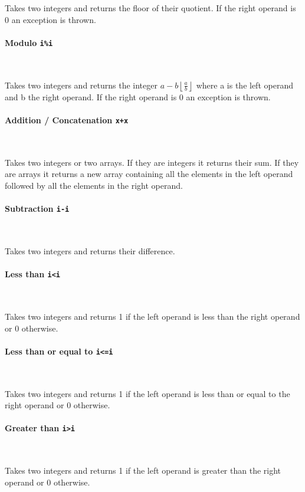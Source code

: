 Takes two integers and returns the floor of their quotient. If the right operand is 0 an exception is thrown.

\paragraph{Modulo \quad \texttt{i\%i}} \

Takes two integers and returns the integer $ a - b \left\lfloor \frac{a}{b} \right\rfloor $ where a is the left operand and b the right operand. If the right operand is 0 an exception is thrown.

\paragraph{Addition / Concatenation \quad \texttt{x+x}} \

Takes two integers or two arrays. If they are integers it returns their sum. If they are arrays it returns a new array containing all the elements in the left operand followed by all the elements in the right operand.

\paragraph{Subtraction \quad \texttt{i-i}} \

Takes two integers and returns their difference.

\paragraph{Less than \quad \texttt{i<i}} \

Takes two integers and returns 1 if the left operand is less than the right operand or 0 otherwise.

\paragraph{Less than or equal to \quad \texttt{i<=i}} \

Takes two integers and returns 1 if the left operand is less than or equal to the right operand or 0 otherwise.

\paragraph{Greater than \quad \texttt{i>i}} \

Takes two integers and returns 1 if the left operand is greater than the right operand or 0 otherwise.

